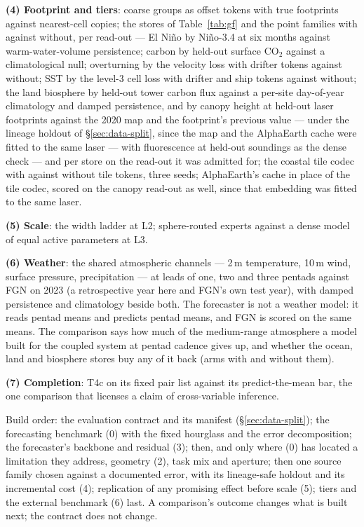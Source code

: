 \documentclass[10pt]{article}
\begin{document}
\textbf{(4) Footprint and tiers}: coarse groups as offset tokens with true
footprints against nearest-cell copies; the stores of Table~\ref{tab:gf} and
the point families with against without, per read-out --- El Ni\~no by
Ni\~no-3.4 at six months against warm-water-volume persistence; carbon by
held-out surface CO$_2$ against a climatological null; overturning by the
velocity loss with drifter tokens against without; SST by the level-3 cell
loss with drifter and ship tokens against without; the land biosphere by
held-out tower carbon flux against a per-site day-of-year climatology and
damped persistence, and by canopy height at held-out laser footprints
against the 2020 map and the footprint's previous value --- under the
lineage holdout of \S\ref{sec:data-split}, since the map and the AlphaEarth
cache were fitted to the same laser --- with fluorescence at held-out
soundings as the dense check --- and per store on the read-out
it was admitted for; the coastal tile codec with against without tile
tokens, three seeds; AlphaEarth's cache in place of the tile codec, scored
on the canopy read-out as well, since that embedding was fitted to the same
laser.

\textbf{(5) Scale}: the width ladder at L2; sphere-routed experts against a
dense model of equal active parameters at L3.

\textbf{(6) Weather}: the shared atmospheric channels --- 2\,m temperature,
10\,m wind, surface pressure, precipitation --- at leads of one, two and
three pentads against FGN on 2023 (a retrospective year here and FGN's own
test year), with damped persistence and climatology beside both. The forecaster is not a weather model: it reads pentad means
and predicts pentad means, and FGN is scored on the same means. The
comparison says how much of the medium-range atmosphere a model built for
the coupled system at pentad cadence gives up, and whether the ocean, land
and biosphere stores buy any of it back (arms with and without them).

\textbf{(7) Completion}: T4c on its fixed pair list against its
predict-the-mean bar, the one comparison that licenses a claim of
cross-variable inference.

Build order: the evaluation contract and its manifest
(\S\ref{sec:data-split}); the forecasting benchmark (0) with the fixed
hourglass and the error decomposition; the forecaster's backbone and
residual (3); then, and only where (0) has located a limitation they
address, geometry (2), task mix and aperture; then one source family chosen
against a documented error, with its lineage-safe holdout and its
incremental cost (4); replication of any promising effect before scale (5);
tiers and the external benchmark (6) last. A comparison's outcome changes
what is built next; the contract does not change.
\end{document}
